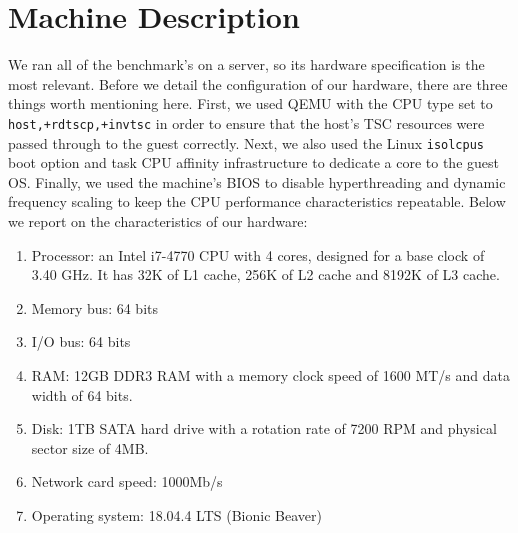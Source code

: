 \section{Machine Description}
\label{sec:md}
We ran all of the benchmark's on a server, so its hardware
specification is the most relevant.  Before we detail the configuration of our hardware, there are three things worth mentioning here.
First, we used QEMU with the CPU type
set to \verb|host,+rdtscp,+invtsc| in order to ensure that the host's
TSC resources were passed through to the guest correctly. 
Next, we also
used the Linux \verb|isolcpus| boot option and task CPU affinity infrastructure to
dedicate a core to the guest OS.
Finally, we used the machine's BIOS to disable hyperthreading and
dynamic frequency scaling to keep the CPU performance characteristics repeatable.
Below we report on the characteristics of our hardware:
\begin{enumerate}
    \item Processor: an Intel i7-4770 CPU with 4 cores, designed for a base clock of 3.40 GHz. 
    It has 32K of L1 cache, 256K of L2 cache and 8192K of L3 cache.
    \item Memory bus: 64 bits
    \item I/O bus: 64 bits
    \item RAM: 12GB DDR3 RAM with a memory clock speed of 1600 MT/s and data width of 64 bits.
    \item Disk: 1TB SATA hard drive with a rotation rate of 7200 RPM and physical sector size of 4MB.
    \item Network card speed: 1000Mb/s
    \item Operating system: 18.04.4 LTS (Bionic Beaver)
\end{enumerate}
